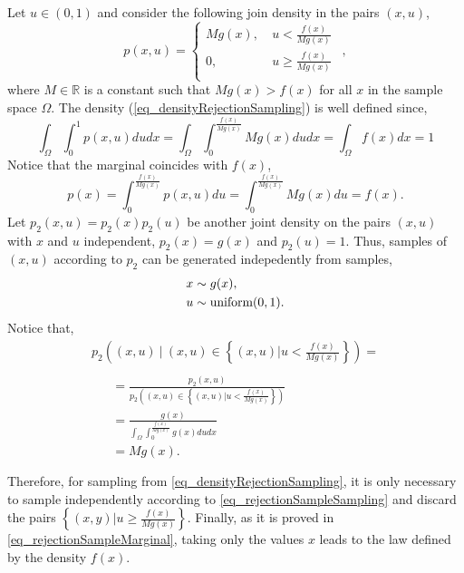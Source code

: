 Let $u \in (0,1)$ and consider the following join density in the pairs $(x,u)$,
\begin{equation} \label{eq_densityRejectionSampling}
  p(x,u) = \left\{ \begin{array}{cc}
    M g(x), \ &u < \frac{f(x)}{Mg(x)} \\
    0, &u \geq \frac{f(x)}{Mg(x)} \\
  \end{array} \right. \ \ ,
\end{equation}
where $M \in \mathbb{R}$ is a constant such that $Mg(x) > f(x)$ for all $x$ in the sample space $\Omega$. The density (\ref{eq_densityRejectionSampling}) is well defined since,
$$
  \int_{\Omega} \int_0^1 p(x,u)dudx
    = \int_{\Omega} \int_0^{\frac{f(x)}{Mg(x)}} Mg(x) du dx
    = \int_{\Omega} f(x) dx = 1
$$
Notice that the marginal coincides with $f(x)$,
\begin{equation} \label{eq_rejectionSampleMarginal}
  p(x) = \int_0^{\frac{f(x)}{Mg(x)}} p(x,u) du
       = \int_0^{\frac{f(x)}{Mg(x)}} M g(x) du = f(x).
\end{equation}
Let $p_2(x,u) = p_2(x)p_2(u)$ be another joint density on the pairs $(x,u)$ with $x$ and $u$ independent, $p_2(x) = g(x)$ and $p_2(u) = 1$. Thus, samples of $(x,u)$ according to $p_2$ can be generated indepedently from samples,
\begin{equation} \label{eq_rejectionSampleSampling}
  \begin{aligned}
    x &\sim g(x), \\
    u &\sim \textup{uniform}(0,1).
  \end{aligned}
\end{equation}
Notice that,
$$
\begin{aligned}
  p_2\left((x,u) \ | \ (x,u) \in \left\{ (x,u) | u < \frac{f(x)}{Mg(x)} \right\} \right) = \\
 \begin{array}{r} \begin{aligned}
    &= \frac{p_2(x,u)}{ p_2\left((x,u) \in \left\{ (x,u) | u < \frac{f(x)}{Mg(x)}\right\} \right) } \\
    &= \frac{g(x)}{\int_{\Omega} \int_0^{\frac{f(x)}{Mg(x)}}g(x)dudx} \\
    &= Mg(x). \\
 \end{aligned} \end{array}
\end{aligned}
$$
Therefore, for sampling from \ref{eq_densityRejectionSampling}, it is only necessary to sample independently according to \ref{eq_rejectionSampleSampling} and discard the pairs $\left\{ (x,y) | u \geq  \frac{f(x)}{Mg(x)} \right\}$. Finally, as it is proved in \ref{eq_rejectionSampleMarginal}, taking only the values $x$ leads to the law defined by the density $f(x)$.

